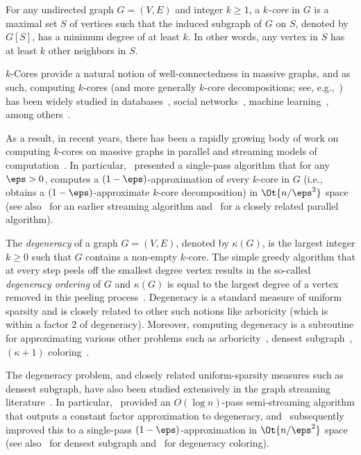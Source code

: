 For any undirected graph $G=(V,E)$ and integer $k \geq 1$, a \emph{$k$-core} in $G$ is a maximal set $S$ of vertices such that the induced subgraph of $G$ on $S$, denoted by $G[S]$, has a minimum degree of at least $k$. In other words, 
any vertex in $S$ has at least $k$ other neighbors in $S$. 

$k$-Cores provide a natural notion of well-connectedness in massive graphs, and as such, computing $k$-cores (and more generally $k$-core decompositions; see, e.g.,~\cite{LiuSYDS22}) 
has been widely studied in databases~\cite{BonchiGKV14, ChuZ00ZXZ20, LiZZQZL19}, social networks~\cite{DhulipalaBS17, DhulipalaBS18, KhaouidBST15}, machine learning~\cite{Alvarez-HamelinDBV05, EsfandiariLM18, GhaffariLM19}, 
among others~\cite{LiWSX18,GalimbertiBGL20, SariyuceGJWC13}. 

As a result, in recent years, there has been a rapidly growing body of work on
computing $k$-cores on massive graphs in parallel and streaming
models of computation~\cite{SariyuceGJWC13,DhulipalaBS17, DhulipalaBS18,EsfandiariLM18, GhaffariLM19,LiuSYDS22}. In particular,~\cite{EsfandiariLM18} presented a single-pass algorithm that for any $\eps > 0$, 
computes a $(1-\eps)$-approximation of every $k$-core in $G$ (i.e., obtains a $(1-\eps)$-approximate $k$-core decomposition) in $\Ot{n/\eps^2}$ space (see also~\cite{SariyuceGJWC13} for an earlier streaming algorithm and~\cite{GhaffariLM19}
for a closely related parallel algorithm). 

The \emph{degeneracy} of a graph $G=(V,E)$, denoted by $\kappa(G)$, is the largest integer $k \geq 0$ such that $G$ contains a non-empty $k$-core. 
The simple greedy algorithm that at every step peels off the smallest degree vertex results in the so-called \emph{degeneracy ordering} of $G$ and $\kappa{(G)}$ 
is equal to the largest degree of a vertex removed in this peeling process~\cite{MatulaB83}. Degeneracy is a standard measure of uniform sparsity and is closely
related to other such notions like arboricity (which is within a factor $2$ of degeneracy). Moreover, computing degeneracy is a subroutine for approximating various
other problems such as arboricity~\cite{AlonYZ97}, densest subgraph~\cite{Charikar00}, $(\kappa+1)$ coloring~\cite{erdHos1966chromatic}. 

The degeneracy problem, and closely related uniform-sparsity measures such as densest subgraph, have also been studied extensively in the graph 
streaming literature~\cite{BahmaniKV12,Farach-ColtonT14,BhattacharyaHNT15,McGregorTVV15,Farach-ColtonT16,BeraCG19,AlonA20}. In particular,~\cite{Farach-ColtonT14} provided an $O(\log{n})$-pass semi-streaming algorithm that outputs a constant factor approximation to degeneracy, and~\cite{Farach-ColtonT16} subsequently improved this to a single-pass $(1-\eps)$-approximation in $\Ot{n/\eps^2}$ space (see also~\cite{McGregorTVV15} for densest subgraph and~\cite{BeraCG19,AlonA20} for degeneracy coloring). 
 

